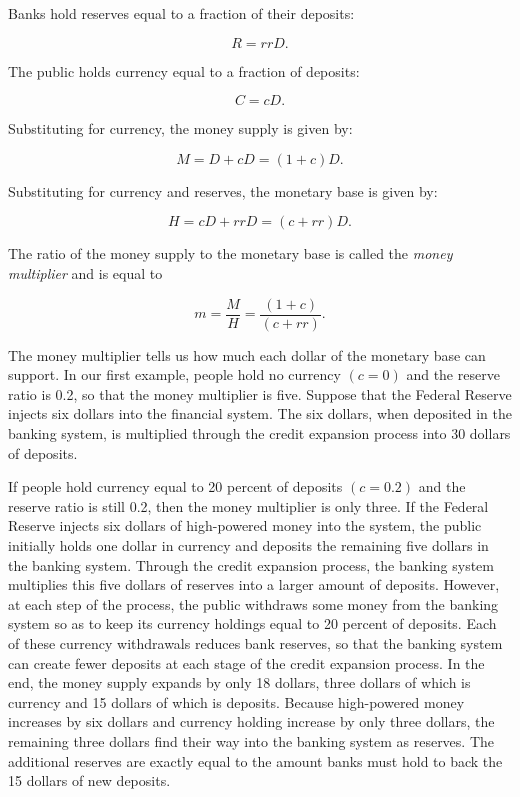 \documentclass[letterpaper,12pt]{article}
\begin{document}
Banks hold reserves equal to a fraction of their deposits:

\begin{equation*}
R=rrD.
\end{equation*}

The public holds currency equal to a fraction of deposits:

\begin{equation*}
C=cD.
\end{equation*}

Substituting for currency, the money supply is given by:

\begin{equation*}
M=D+cD=(1+c)D.
\end{equation*}

Substituting for currency and reserves, the monetary base is given
by:

\begin{equation*}
H=cD+rrD=(c+rr)D.
\end{equation*}

The ratio of the money supply to the monetary base is called the
\textit{money multiplier} and is equal to

\begin{equation*}
m=\frac MH=\frac{(1+c)}{(c+rr)}.
\end{equation*}

The money multiplier tells us how much each dollar of the monetary
base can support. In our first example, people hold no currency
$(c=0)$ and the reserve ratio is 0.2, so that the money multiplier
is five. Suppose that the Federal Reserve injects six dollars into
the financial system. The six dollars, when deposited in the banking
system, is multiplied through the credit expansion process into 30
dollars of deposits.

If people hold currency equal to 20 percent of deposits $(c=0.2)$
and the reserve ratio is still 0.2, then the money multiplier is
only three. If the Federal Reserve injects six dollars of
high-powered money into the system, the public initially holds one
dollar in currency and deposits the remaining five dollars in the
banking system. Through the credit expansion process, the banking
system multiplies this five dollars of reserves into a larger amount
of deposits. However, at each step of the process, the public
withdraws some money from the banking system so as to keep its
currency holdings equal to 20 percent of deposits. Each of these
currency withdrawals reduces bank reserves, so that the banking
system can create fewer deposits at each stage of the credit
expansion process. In the end, the money supply expands by only 18
dollars, three dollars of which is currency and 15 dollars of which
is deposits. Because high-powered money increases by six dollars and
currency holding increase by only three dollars, the remaining three
dollars find their way into the banking system as reserves. The
additional reserves are exactly equal to the amount banks must hold
to back the 15 dollars of new deposits.
\end{document}
